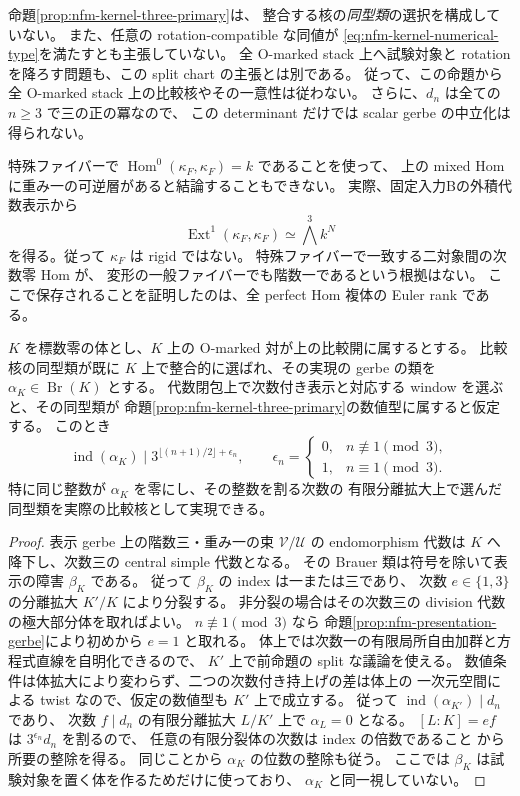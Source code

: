 \begin{remark}[残る降下問題]
命題\ref{prop:nfm-kernel-three-primary}は、
整合する核の\emph{同型類}の選択を構成していない。
また、任意の rotation-compatible な同値が
\eqref{eq:nfm-kernel-numerical-type}を満たすとも主張していない。
全 O-marked stack 上へ試験対象と rotation を降ろす問題も、この split chart の主張とは別である。
従って、この命題から全 O-marked stack 上の比較核やその一意性は従わない。
さらに、$d_n$ は全ての $n\ge3$ で三の正の冪なので、
この determinant だけでは scalar gerbe の中立化は得られない。

特殊ファイバーで
$\operatorname{Hom}^0(\kappa_F,\kappa_F)=k$ であることを使って、
上の mixed Hom に重み一の可逆層があると結論することもできない。
実際、固定入力Bの外積代数表示から
\[
 \operatorname{Ext}^1(\kappa_F,\kappa_F)
       \simeq\bigwedge^3 k^N
\]
を得る。従って $\kappa_F$ は rigid ではない。
特殊ファイバーで一致する二対象間の次数零 Hom が、
変形の一般ファイバーでも階数一であるという根拠はない。
ここで保存されることを証明したのは、全 perfect Hom 複体の Euler rank である。
\end{remark}

\begin{corollary}
\label{cor:nfm-generic-kernel-bound}
$K$ を標数零の体とし、$K$ 上の O-marked 対が上の比較開に属するとする。
比較核の同型類が既に $K$ 上で整合的に選ばれ、その実現の gerbe の類を
$\alpha_K\in\operatorname{Br}(K)$ とする。
代数閉包上で次数付き表示と対応する window を選ぶと、その同型類が
命題\ref{prop:nfm-kernel-three-primary}の数値型に属すると仮定する。
このとき
\[
 \operatorname{ind}(\alpha_K)\mid
 3^{\lfloor(n+1)/2\rfloor+\epsilon_n},
 \qquad
 \epsilon_n=
 \begin{cases}
 0,&n\not\equiv1\pmod3,\\
 1,&n\equiv1\pmod3.
 \end{cases}
\]
特に同じ整数が $\alpha_K$ を零にし、その整数を割る次数の
有限分離拡大上で選んだ同型類を実際の比較核として実現できる。
\end{corollary}

\begin{proof}
表示 gerbe 上の階数三・重み一の束 $\mathcal V/\mathcal U$ の
endomorphism 代数は $K$ へ降下し、次数三の central simple 代数となる。
その Brauer 類は符号を除いて表示の障害 $\beta_K$ である。
従って $\beta_K$ の index は一または三であり、
次数 $e\in\{1,3\}$ の分離拡大 $K'/K$ により分裂する。
非分裂の場合はその次数三の division 代数の極大部分体を取ればよい。
$n\not\equiv1\pmod3$ なら
命題\ref{prop:nfm-presentation-gerbe}により初めから $e=1$ と取れる。
体上では次数一の有限局所自由加群と方程式直線を自明化できるので、
$K'$ 上で前命題の split な議論を使える。
数値条件は体拡大により変わらず、二つの次数付き持上げの差は体上の
一次元空間による twist なので、仮定の数値型も $K'$ 上で成立する。
従って $\operatorname{ind}(\alpha_{K'})\mid d_n$ であり、
次数 $f\mid d_n$ の有限分離拡大 $L/K'$ 上で $\alpha_L=0$ となる。
$[L:K]=ef$ は $3^{\epsilon_n}d_n$ を割るので、
任意の有限分裂体の次数は index の倍数であること
\cite[Lemma~11.8.4]{NFMStacksSplitting}から所要の整除を得る。
同じことから $\alpha_K$ の位数の整除も従う。
ここでは $\beta_K$ は試験対象を置く体を作るためだけに使っており、
$\alpha_K$ と同一視していない。
\end{proof}

